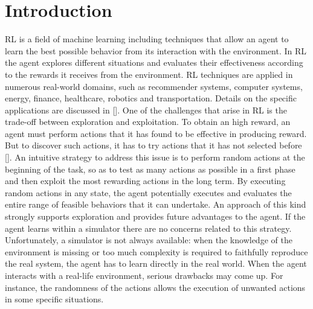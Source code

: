 \chapter{Introduction} \label{ch:intro}

\acf{RL} is a field of machine learning including techniques that allow an agent to learn the best possible behavior from its interaction with the environment. In \ac{RL} the agent explores different situations and evaluates their effectiveness according to the rewards it receives from the environment. \ac{RL} techniques are applied in numerous real-world domains, such as recommender systems, computer systems, energy, finance, healthcare, robotics and transportation. Details on the specific applications are discussed in [\cite{yuxi2019}].
One of the challenges that arise in \ac{RL} is the trade-off between exploration and exploitation. To obtain an high reward, an agent must perform actions that it has found to be effective in producing reward. But to discover such actions, it has to try actions that it has not selected before [\cite{sutton2018reinforcement}]. An intuitive strategy to address this issue is to perform random actions at the beginning of the task, so as to test as many actions as possible in a first phase and then exploit the most rewarding actions in the long term. By executing random actions in any state, the agent potentially executes and evaluates the entire range of feasible behaviors that it can undertake. An approach of this kind strongly supports exploration and provides future advantages to the agent. If the agent learns within a simulator there are no concerns related to this strategy. Unfortunately, a simulator is not always available: when the knowledge of the environment is missing or too much complexity is required to faithfully reproduce the real system, the agent has to learn directly in the real world. When the agent interacts with a real-life environment, serious drawbacks may come up. For instance, the randomness of the actions allows the execution of unwanted actions in some specific situations.\\
\newline
